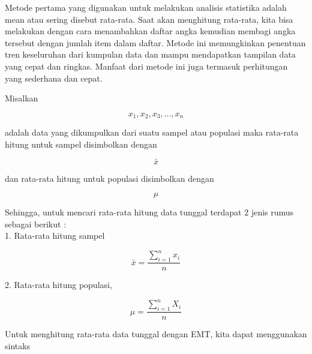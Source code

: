 \documentclass[a4paper,10pt]{article}
\begin{document}
\begin{eulernotebook}
\begin{eulercomment}
\begin{eulercomment}
\begin{eulercomment}
\begin{eulercomment}
\begin{eulercomment}
\begin{eulercomment}
\begin{eulercomment}
\begin{eulercomment}
\begin{eulercomment}
\begin{eulercomment}
\begin{eulercomment}
\end{eulercomment}
\begin{eulercomment}
Metode pertama yang digunakan untuk melakukan analisis statistika
adalah mean atau sering disebut rata-rata. Saat akan menghitung
rata-rata, kita bisa melakukan dengan cara menambahkan daftar angka
kemudian membagi angka tersebut dengan jumlah item dalam daftar.
Metode ini memungkinkan penentuan tren keseluruhan dari kumpulan data
dan mampu mendapatkan tampilan data yang cepat dan ringkas. Manfaat
dari metode ini juga termasuk perhitungan yang sederhana dan cepat.

\end{eulercomment}
\begin{eulercomment}
Misalkan\\
\end{eulercomment}
\begin{eulerformula}
\[
x_1 , x_2 , x_3 ,..., x_n
\]
\end{eulerformula}
\begin{eulercomment}
adalah data yang dikumpulkan dari suatu sampel atau populasi maka
rata-rata hitung untuk sampel disimbolkan dengan\\
\end{eulercomment}
\begin{eulerformula}
\[
\bar{x}
\]
\end{eulerformula}
\begin{eulercomment}
dan rata-rata hitung untuk populasi disimbolkan dengan\\
\end{eulercomment}
\begin{eulerformula}
\[
\mu
\]
\end{eulerformula}
\begin{eulercomment}
Sehingga, untuk mencari rata-rata hitung data tunggal terdapat 2 jenis
rumus sebagai berikut :\\
1. Rata-rata hitung sampel\\
\end{eulercomment}
\begin{eulerformula}
\[
\bar{x}=\frac{\sum_{i=1}^{n} x_i}{n}
\]
\end{eulerformula}
\begin{eulercomment}
2. Rata-rata hitung populasi,\\
\end{eulercomment}
\begin{eulerformula}
\[
\mu=\frac{\sum_{i=1}^{n} X_i}{n}
\]
\end{eulerformula}
\begin{eulercomment}
Untuk menghitung rata-rata data tunggal dengan EMT, kita dapat
menggunakan sintaks


\end{eulercomment}
\end{eulercomment}
\end{eulercomment}
\end{eulercomment}
\end{eulercomment}
\end{eulercomment}
\end{eulercomment}
\end{eulercomment}
\end{eulercomment}
\end{eulercomment}
\end{eulercomment}
\end{eulernotebook}
\end{document}
